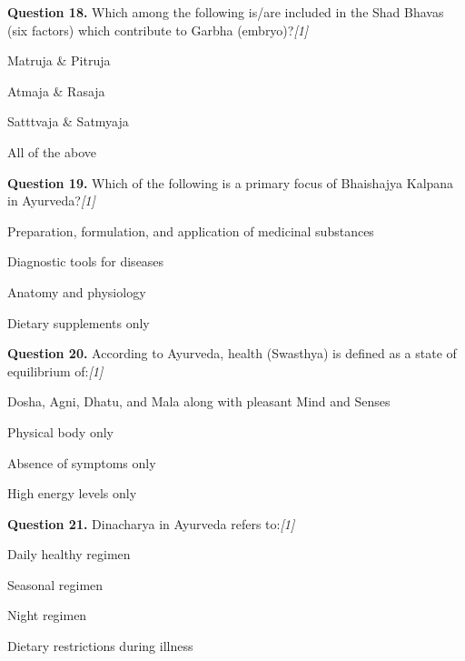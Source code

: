 \documentclass[11pt,a4paper]{article}
\newcommand{\pts}[1]{\hfill   \textit{[#1]}}
\begin{document}
\medskip




\noindent   \textbf{Question 18.} Which among the following is/are included in the Shad Bhavas (six factors) which contribute to Garbha (embryo)?\pts{1}

\begin{parts}
  \item Matruja \& Pitruja
  \item Atmaja \& Rasaja
  \item Satttvaja \& Satmyaja
  \item All of the above
\end{parts}

\medskip




\noindent   \textbf{Question 19.} Which of the following is a primary focus of Bhaishajya Kalpana in Ayurveda?\pts{1}

\begin{parts}
  \item Preparation, formulation, and application of medicinal substances
  \item Diagnostic tools for diseases
  \item Anatomy and physiology
  \item Dietary supplements only
\end{parts}

\medskip




\noindent   \textbf{Question 20.} According to Ayurveda, health (Swasthya) is defined as a state of equilibrium of:\pts{1}

\begin{parts}
  \item Dosha, Agni, Dhatu, and Mala along with pleasant Mind and Senses
  \item Physical body only
  \item Absence of symptoms only
  \item High energy levels only
\end{parts}

\medskip




\noindent   \textbf{Question 21.} Dinacharya in Ayurveda refers to:\pts{1}

\begin{parts}
  \item Daily healthy regimen
  \item Seasonal regimen
  \item Night regimen
  \item Dietary restrictions during illness
\end{parts}
\end{document}
